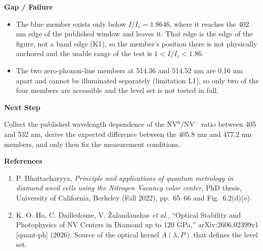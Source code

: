\documentclass[11pt,a4paper]{ltjsarticle}
\newcommand{\sectionblock}[1]{%
  \vspace{4mm}
  {\large\textbf{\textcolor{SciBlue}{#1}}}
  \vspace{2mm}

}
\begin{document}
\sectionblock{Gap / Failure}

\begin{itemize}[leftmargin=8mm]
  \item The blue member exists only below \(I/I_c=1.8646\), where it reaches the 402 nm edge of the published window and leaves it. That edge is the edge of the figure, not a band edge (K1), so the member's position there is not physically anchored and the usable range of the test is \(1<I/I_c<1.86\).
  \item The two zero-phonon-line members at 514.36 and 514.52 nm are 0.16 nm apart and cannot be illuminated separately (limitation L1), so only two of the four members are accessible and the level set is not tested in full.
\end{itemize}

\sectionblock{Next Step}

Collect the published wavelength dependence of the NV\(^0\)/NV\(^-\) ratio between 405 and 532 nm, derive the expected difference between the 405.8 nm and 477.2 nm members, and only then fix the measurement conditions.

\sectionblock{References}

\begin{enumerate}[leftmargin=8mm]
  \item P. Bhattacharyya, \textit{Principle and applications of quantum metrology in diamond anvil cells using the Nitrogen Vacancy color center}, PhD thesis, University of California, Berkeley (Fall 2022), pp.~65--66 and Fig.~6.2(d)(e).
  \item K. O. Ho, C. Dailledouze, V. \v{Z}alandauskas \textit{et al.}, ``Optical Stability and Photophysics of NV Centers in Diamond up to 120 GPa,'' arXiv:2606.02399v1 [quant-ph] (2026). Source of the optical kernel \(A(\lambda,P)\) that defines the level set.
\end{enumerate}
\end{document}

